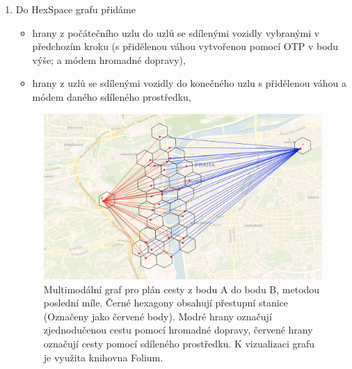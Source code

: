 \documentclass[thesis=M,czech]{FITthesis}[2019/12/23]
\theoremstyle{plain}
\theoremstyle{definition}
\begin{document}
\begin{enumerate}
\begin{itemize}
	\end{itemize}

	\item Do HexSpace grafu přidáme

	\begin{itemize}
		\item hrany z počátečního uzlu do uzlů se sdílenými vozidly vybranými v předchozím kroku (s přidělenou váhou vytvořenou pomocí OTP v bodu výše; a módem hromadné dopravy),
		\item hrany z uzlů se sdílenými vozidly do konečného uzlu s přidělenou váhou a módem daného sdíleného prostředku,
	\end{itemize}

	\begin{figure}[H]\centering
		\includegraphics[width=1\textwidth]{graphs/multimodal-last-mile.png}
	
		\caption[Multimodální graf pro plán cesty z bodu A do bodu B, metodou poslední míle. ]{Multimodální graf pro plán cesty z bodu A do bodu B, metodou poslední míle. Černé hexagony obsahují přestupní stanice (Označeny jako červené body). Modré hrany označují zjednodučenou cestu pomocí hromadné dopravy, červené hrany označují cesty pomocí sdíleného prostředku. K vizualizaci grafu je využita knihovna Folium. \cite{folium}}\label{fig:singlemodal-graph}
	
	\end{figure}
	



\end{enumerate}
\end{document}
